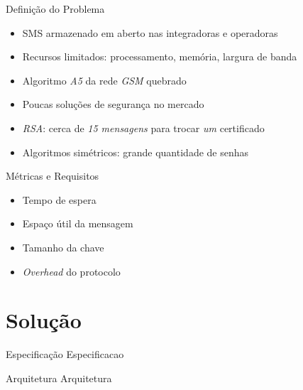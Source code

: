 \documentclass[notes,blue,mathserif]{beamer}
\begin{document}
\begin{frame}{Defini\c{c}\~{a}o do Problema}
\begin{itemize}[<+->]
\item SMS armazenado em aberto nas integradoras\/ e operadoras
\item Recursos limitados: processamento, mem\'{o}ria, largura de banda
\item Algoritmo \emph{A5} da rede \emph{GSM} quebrado
\item Poucas solu\c{c}\~{o}es de seguran\c{c}a no mercado
\item \emph{RSA}: cerca de \textit{15 mensagens} para trocar \textit{um} certificado
\item Algoritmos sim\'{e}tricos: grande quantidade de senhas
\end{itemize}
\end{frame}


\begin{frame}{M\'{e}tricas e Requisitos}
\begin{itemize}[<+->]
\item Tempo de espera
\item Espa\c{c}o \'{u}til da mensagem
\item Tamanho da chave
\item \textit{Overhead} do protocolo
\end{itemize}
\end{frame}

\section{Solu\c{c}\~{a}o}

\begin{frame}{Especifica\c{c}\~{a}o}
Especificacao
\end{frame}

\begin{frame}{Arquitetura}
Arquitetura
\end{frame}
\end{document}
